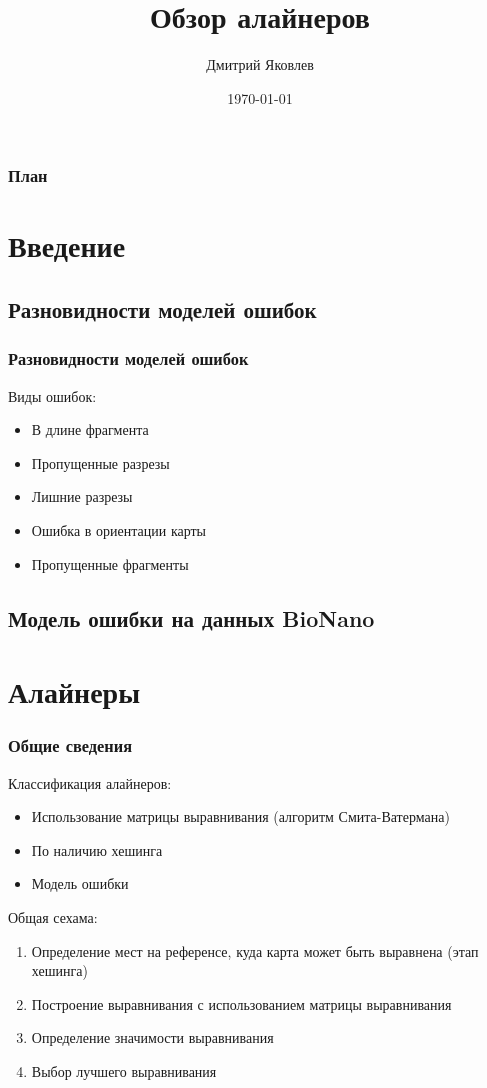\documentclass{beamer}
\title[Обзор алайнеров]{Обзор алайнеров}
\author{Дмитрий Яковлев}
\institute{EPAM Systems}
\date{\today}
\begin{document}
\graphicspath{{./img/}}

\begin{frame}
  \titlepage
\end{frame}

\begin{frame}
\frametitle{План}
\tableofcontents
\end{frame}

\section{Введение}


\subsection{Разновидности моделей ошибок}

\begin{frame}
\frametitle{Разновидности моделей ошибок}
Виды ошибок:
\begin{itemize}
  \item В длине фрагмента
  \item Пропущенные разрезы
  \item Лишние разрезы
  \item Ошибка в ориентации карты
  \item Пропущенные фрагменты
\end{itemize}

\end{frame}

\subsection{Модель ошибки на данных BioNano}


\section{Алайнеры}

\begin{frame}
\frametitle{Общие сведения}
Классификация алайнеров:
\begin{itemize}
  \item Использование матрицы выравнивания (алгоритм Смита-Ватермана)
  \item По наличию хешинга
  \item Модель ошибки
\end{itemize}
Общая сехама:
\begin{enumerate}
  \item Определение мест на референсе, куда карта может быть выравнена (этап хешинга)
  \item Построение выравнивания с использованием матрицы выравнивания
  \item Определение значимости выравнивания
  \item Выбор лучшего выравнивания
\end{enumerate}
\end{frame}
\end{document}
